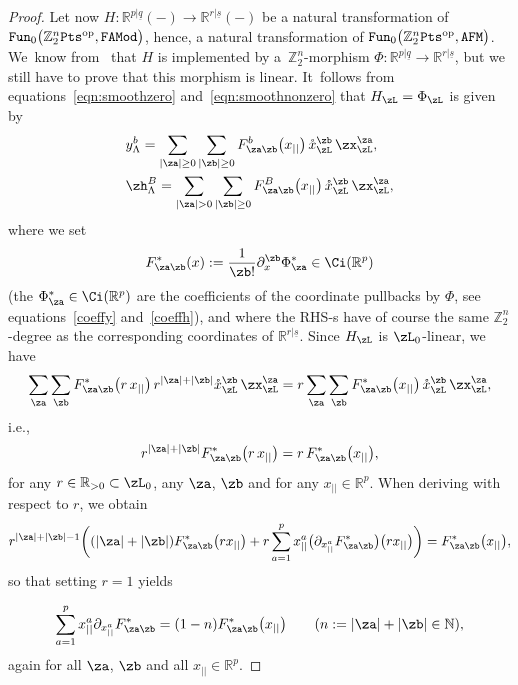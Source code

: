 \documentclass[pdftex]{sigma}%
\newcommand{\op}[1]{\operatorname{#1}}
\newcommand{\R}{{\mathbb R}}
\newcommand{\Z}{{\mathbb Z}}
\def\ul{\underline}
\def\ul{\underline}
\newcommand{\0}{\otimes}
\newcommand{\z}{\Z_2^n}
\numberwithin{equation}{section}
\begin{document}
\begin{proof}
Let now $H\colon \R^{p|\ul q}(-)\to \R^{r|\ul s}(-)$ be a natural transformation of ${\tt Fun}_0\big(\z{\tt Pts}^{\op{op}},\tt FAMod\big)$, hence, a natural transformation of ${\tt Fun}_0\big(\z{\tt Pts}^{\op{op}},\tt AFM\big)$. We~know from~\cite{Bruce:2019b} that $H$ is implemented by a~$\z$-morphism $\Phi\colon \R^{p|\ul q}\to \R^{r|\ul s}$, but we still have to prove that this morphism is linear. It~follows from equations~\eqref{eqn:smoothzero} and~\eqref{eqn:smoothnonzero} that $H_\zL=\Phi_\zL$ is given by
\begin{subequations}
\begin{align}
& y^b_\Lambda = \sum_{|\za|\ge 0}\sum_{|\zb|\ge 0}F^b_{\za\zb}\big(x_{||}\big)\,\mathring{x}_\zL^\zb\,\zx_\zL^\za, \label{eqn:smoothzero2}\\
& \zh^B_\Lambda =\sum_{|\za|> 0}\sum_{|\zb|\ge 0}F^B_{\za\zb}\big(x_{||}\big)\,\mathring{x}_\zL^\zb\,\zx_\zL^\za, \label{eqn:smoothnonzero2}
\end{align}
\end{subequations}
where we set
\begin{gather}\label{ExplForm}
F^\ast_{\za\zb}(x):=\frac{1}{\zb !}\partial_x^\zb\Phi_\za^\ast\in\Ci(\R^p)
\end{gather}
(the $\Phi^*_\za\in\Ci(\R^p)$ are the coefficients of the coordinate pullbacks by $\Phi$, see equations~\eqref{coeffy} and~\eqref{coeffh}), and where the {\small RHS}-s have of course the same $\z$-degree as the corresponding coordinates of $\R^{r|\ul s}$. Since $H_\zL$ is $\zL_0$-linear, we have
\[
\sum_{\za}\sum_{\zb}F^\ast_{\za\zb}\big(r\, x_{||}\big)\,r^{|\za|+|\zb|}\mathring{x}_\zL^\zb\,\zx_\zL^\za=r\sum_{\za}\sum_{\zb}F^\ast_{\za\zb}\big(x_{||}\big)\,\mathring{x}_\zL^\zb\,\zx_\zL^\za,
\]
i.e.,
\[
r^{|\za|+|\zb|}F^\ast_{\za\zb}\big(r\, x_{||}\big)=r\, F^\ast_{\za\zb}\big(x_{||}\big) ,
\]
for any $r\in\R_{>0}\subset\zL_0$, any $\za$, $\zb$ and for any $x_{||}\in\R^p$. When deriving with respect to $r$, we obtain
\[
r^{|\za|+|\zb|-1}\bigg((|\za|+|\zb|)F^\ast_{\za\zb}\big(r x_{||}\big)+r\sum_{a=1}^{p}x_{||}^a\big(\partial_{x^a_{||}} F^*_{\za\zb}\big)\big(r x_{||}\big)\bigg)=F_{\za\zb}^\ast\big(x_{||}\big),
\]
so that setting $r=1$ yields
{\samepage\begin{gather}\label{EVF}
\sum_{a=1}^{p}x_{||}^a\partial_{x^a_{||}} F^*_{\za\zb}=(1-n)F_{\za\zb}^\ast\big(x_{||}\big)\qquad
(n:=|\za|+|\zb|\in\mathbb{N}),
\end{gather}
again for all $\za$, $\zb$ and all $x_{||}\in\R^p$.

}


\end{proof}
\end{document}
